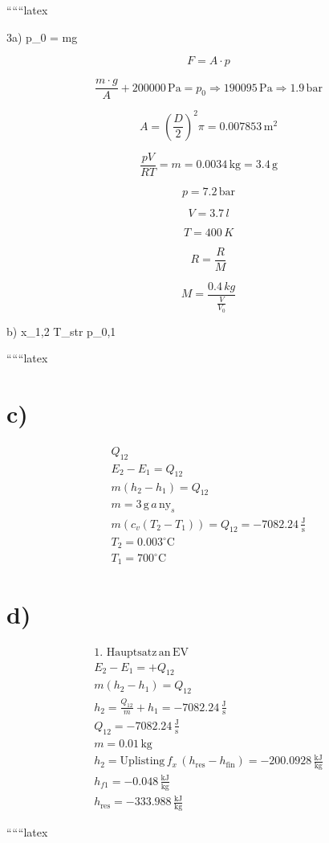 
``````latex


3a) \quad p_0 = mg

\[
F = A \cdot p
\]

\[
\frac{m \cdot g}{A} + 200000 \, \text{Pa} = p_0 \Rightarrow 190095 \, \text{Pa} \Rightarrow 1.9 \, \text{bar}
\]

\[
A = \left( \frac{D}{2} \right)^2 \pi = 0.007853 \, \text{m}^2
\]

\[
\frac{pV}{RT} = m = 0.0034 \, \text{kg} = 3.4 \, \text{g}
\]

\[
p = 7.2 \, \text{bar}
\]

\[
V = 3.7 \, l
\]

\[
T = 400 \, K
\]

\[
R = \frac{R}{M}
\]

\[
M = \frac{0.4 \, kg}{\frac{V}{V_0}}
\]

b) \quad x_{1,2}  \quad T_{str} \quad p_{0,1}

``````latex


\section*{c)}

\begin{align*}
Q_{12} \\
E_2 - E_1 = Q_{12} \\
m(h_2 - h_1) = Q_{12} \\
m = 3 \, \text{g} \, a \, \text{ny}_s \\
m(c_v(T_2 - T_1)) = Q_{12} = -7082.24 \, \frac{\text{J}}{\text{s}} \\
T_2 = 0.003^\circ \text{C} \\
T_1 = 700^\circ \text{C}
\end{align*}

\section*{d)}

\begin{align*}
\text{1. Hauptsatz} \, \text{an} \, \text{EV} \\
E_2 - E_1 = + Q_{12} \\
m(h_2 - h_1) = Q_{12} \\
h_2 = \frac{Q_{12}}{m} + h_1 = -7082.24 \, \frac{\text{J}}{\text{s}} \\
Q_{12} = -7082.24 \, \frac{\text{J}}{\text{s}} \\
m = 0.01 \, \text{kg} \\
h_2 = \text{Uplisting} \, f_x \, (h_{\text{res}} - h_{\text{fin}}) = -200.0928 \, \frac{\text{kJ}}{\text{kg}} \\
h_{f1} = -0.048 \, \frac{\text{kJ}}{\text{kg}} \\
h_{\text{res}} = -333.988 \, \frac{\text{kJ}}{\text{kg}}
\end{align*}

``````latex



